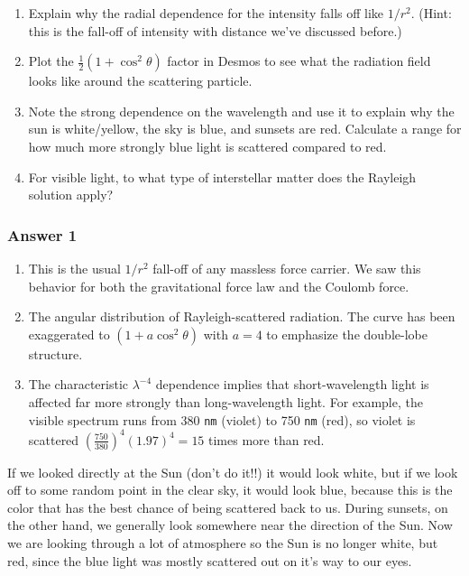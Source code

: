 \documentclass[11pt]{article}
\begin{document}
\begin{enumerate}
\def\labelenumi{\alph{enumi}.}
\item
  Explain why the radial dependence for the intensity falls off like
  \(1/r^2\). (Hint: this is the fall-off of intensity with distance
  we've discussed before.)
\item
  Plot the \(\frac12\left(1+\cos^2\theta\right)\) factor in Desmos to
  see what the radiation field looks like around the scattering
  particle.
\item
  Note the strong dependence on the wavelength and use it to explain why
  the sun is white/yellow, the sky is blue, and sunsets are red.
  Calculate a range for how much more strongly blue light is scattered
  compared to red.
\item
  For visible light, to what type of interstellar matter does the
  Rayleigh solution apply?
\end{enumerate}
 

     
\subsubsection{Answer 1}\label{answer-1}

\begin{enumerate}
\def\labelenumi{\alph{enumi}.}
\item
  This is the usual \(1/r^2\) fall-off of any massless force carrier. We
  saw this behavior for both the gravitational force law and the Coulomb
  force.
\item
  The angular distribution of Rayleigh-scattered radiation. The curve
  has been exaggerated to \((1+a \cos^2\theta)\) with \(a=4\) to
  emphasize the double-lobe structure.
\item
  The characteristic \(\lambda^{-4}\) dependence implies that
  short-wavelength light is affected far more strongly than
  long-wavelength light. For example, the visible spectrum runs from 380
  \texttt{nm} (violet) to 750 \texttt{nm} (red), so violet is scattered
  \(\left(\frac{750}{380}\right)^4  \left(1.97\right)^4=15\) times more
  than red.
\end{enumerate}

If we looked directly at the Sun (don't do it!!) it would look white,
but if we look off to some random point in the clear sky, it would look
blue, because this is the color that has the best chance of being
scattered back to us. During sunsets, on the other hand, we generally
look somewhere near the direction of the Sun. Now we are looking through
a lot of atmosphere so the Sun is no longer white, but red, since the
blue light was mostly scattered out on it's way to our eyes.
\end{document}
